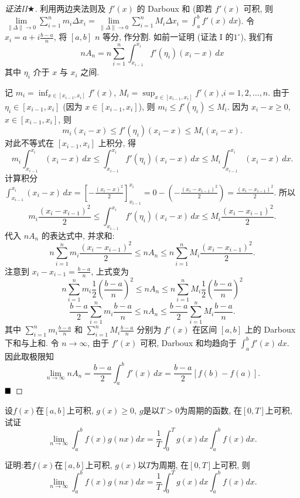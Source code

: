 \documentclass[lang=cn,newtx,10pt,scheme=chinese]{elegantbook}
\begin{document}
\begin{proof}[证法II$\bigstar$]
利用两边夹法则及 $f'(x)$ 的 Darboux 和 (即若 $f'(x)$ 可积, 则 $\lim\limits_{\|\Delta\| \to 0} \sum_{i=1}^n m_i \Delta x_i = \lim\limits_{\|\Delta\| \to 0} \sum_{i=1}^n M_i \Delta x_i = \int_a^b f'(x) \,dx$).
令 $x_i = a + i \frac{b-a}{n}$, 将 $[a,b]$ $n$ 等分, 作分割. 如前一证明 (证法 I 的$1^{\circ}$), 我们有
$$ nA_n = n \sum_{i=1}^n \int_{x_{i-1}}^{x_i} f'(\eta_i)(x_i - x) \,dx $$
其中 $\eta_i$ 介于 $x$ 与 $x_i$ 之间.

记 $m_i = \inf_{x \in [x_{i-1}, x_i]} f'(x)$, $M_i = \sup_{x \in [x_{i-1}, x_i]} f'(x)$,$i=1,2,\dots,n$.
由于 $\eta_i \in [x_{i-1}, x_i]$ (因为 $x \in [x_{i-1}, x_i]$), 则 $m_i \leq f'(\eta_i) \leq M_i$.
因为 $x_i - x \geq 0$, $x \in [x_{i-1}, x_i]$, 则
$$ m_i(x_i-x) \leq f'(\eta_i)(x_i-x) \leq M_i(x_i-x). $$
对此不等式在 $[x_{i-1}, x_i]$ 上积分, 得
$$ m_i \int_{x_{i-1}}^{x_i} (x_i-x) \,dx \leq \int_{x_{i-1}}^{x_i} f'(\eta_i)(x_i-x) \,dx \leq M_i \int_{x_{i-1}}^{x_i} (x_i-x) \,dx. $$
计算积分 $\int_{x_{i-1}}^{x_i} (x_i-x) \,dx = \left[ -\frac{(x_i-x)^2}{2} \right]_{x_{i-1}}^{x_i} = 0 - \left( -\frac{(x_i-x_{i-1})^2}{2} \right) = \frac{(x_i-x_{i-1})^2}{2}$.
所以
$$ m_i \frac{(x_i-x_{i-1})^2}{2} \leq \int_{x_{i-1}}^{x_i} f'(\eta_i)(x_i-x) \,dx \leq M_i \frac{(x_i-x_{i-1})^2}{2}. $$
代入 $nA_n$ 的表达式中, 并求和:
$$ n \sum_{i=1}^n m_i \frac{(x_i-x_{i-1})^2}{2} \leq nA_n \leq n \sum_{i=1}^n M_i \frac{(x_i-x_{i-1})^2}{2}. $$
注意到 $x_i - x_{i-1} = \frac{b-a}{n}$, 上式变为
$$ n \sum_{i=1}^n m_i \frac{1}{2}\left(\frac{b-a}{n}\right)^2 \leq nA_n \leq n \sum_{i=1}^n M_i \frac{1}{2}\left(\frac{b-a}{n}\right)^2 $$
$$ \frac{b-a}{2} \sum_{i=1}^n m_i \frac{b-a}{n} \leq nA_n \leq \frac{b-a}{2} \sum_{i=1}^n M_i \frac{b-a}{n}. $$
其中 $\sum_{i=1}^n m_i \frac{b-a}{n}$ 和 $\sum_{i=1}^n M_i \frac{b-a}{n}$ 分别为 $f'(x)$ 在区间 $[a,b]$ 上的 Darboux 下和与上和.
令 $n \to \infty$, 由于 $f'(x)$ 可积, Darboux 和均趋向于 $\int_a^b f'(x) \,dx$. 因此取极限知
$$ \lim\limits_{n \to \infty} nA_n = \frac{b-a}{2} \int_a^b f'(x) \,dx = \frac{b-a}{2} [f(b)-f(a)]. $$
$\hfill \blacksquare$
\end{proof}

\begin{example}
设$f(x)$在$[a,b]$上可积, $g(x) \ge 0$, $g$是以$T>0$为周期的函数, 在$[0,T]$上可积, 试证
$$ \lim\limits_{n \to \infty} \int_{a}^{b} f(x) g(nx) dx = \frac{1}{T} \int_{0}^{T} g(x) dx \int_{a}^{b} f(x) dx. $$
\end{example}

\begin{example}[(Riemann 引理)]
证明:若$f(x)$在$[a,b]$上可积, $g(x)$以$T$为周期, 在$[0,T]$上可积, 则
$$ \lim\limits_{n \to \infty} \int_{a}^{b} f(x)g(nx)dx = \frac{1}{T}\int_{0}^{T} g(x)dx \int_{a}^{b} f(x)dx. $$
\end{example}
\end{document}

